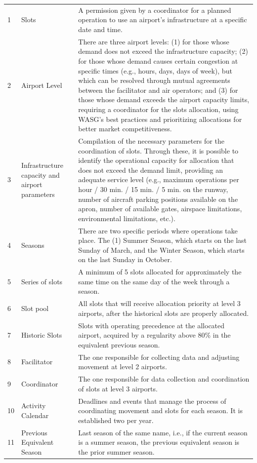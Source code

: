 \begin{center}
\begin{xltabular}{\textwidth}{p{0.5cm} p{4cm} p{10cm}}
1 & Slots & A permission given by a coordinator for a planned operation to use an airport's infrastructure at a specific date and time. \\ 
2 & Airport Level & There are three airport levels: (1) for those whose demand does not exceed the infrastructure capacity; (2) for those whose demand causes certain congestion at specific times (e.g., hours, days, days of week), but which can be resolved through mutual agreements between the facilitator and air operators; and (3) for those whose demand exceeds the airport capacity limits, requiring a coordinator for the slots allocation, using WASG's best practices and prioritizing allocations for better market competitiveness. \\
3 & Infrastructure capacity and airport parameters & Compilation of the necessary parameters for the coordination of slots. Through these, it is possible to identify the operational capacity for allocation that does not exceed the demand limit, providing an adequate service level (e.g., maximum operations per hour / 30 min. / 15 min. / 5 min. on the runway, number of aircraft parking positions available on the apron, number of available gates, airspace limitations, environmental limitations, etc.). \\
4 & Seasons & There are two specific periods where operations take place. The (1) Summer Season, which starts on the last Sunday of March, and the Winter Season, which starts on the last Sunday in October. \\
5 & Series of slots & A minimum of 5 slots allocated for approximately the same time on the same day of the week through a season. \\
6 & Slot pool & All slots that will receive allocation priority at level 3 airports, after the historical slots are properly allocated. \\
7 & Historic Slots & Slots with operating precedence at the allocated airport, acquired by a regularity above 80\% in the equivalent previous season. \\
8 & Facilitator & The one responsible for collecting data and adjusting movement at level 2 airports. \\
9 & Coordinator & The one responsible for data collection and coordination of slots at level 3 airports. \\
10 & Activity Calendar & Deadlines and events that manage the process of coordinating movement and slots for each season. It is established two per year. \\
11 & Previous Equivalent Season & Last season of the same name, i.e., if the current season is a summer season, the previous equivalent season is the prior summer season. \\

\end{xltabular}
\end{center}
